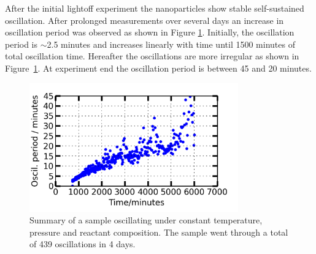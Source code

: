 \documentclass[8.5pt,twoside,twocolumn]{article}
\begin{document}
After the initial lightoff experiment the nanoparticles show stable self-sustained oscillation. After prolonged measurements over several days an increase in oscillation period was observed as shown in Figure \ref{fgr:long_measurement}. Initially, the oscillation period is $\sim$2.5 minutes and increases linearly with time until 1500 minutes of total oscillation time. Hereafter the oscillations are more irregular as shown in Figure~\ref{fgr:long_measurement}. At experiment end the oscillation period is between 45 and 20 minutes.
\begin{figure}[h]
\centering
  \includegraphics[width=9cm]{summary_of_long_measurement.png}
  \caption{Summary of a sample oscillating under constant temperature, pressure and reactant composition. The sample went through a total of 439 oscillations in 4 days.}
  \label{fgr:long_measurement}
\end{figure}
  
\end{document}
